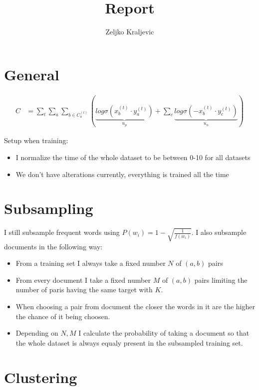 \documentclass[11pt,a4paper]{article}
\title{Report}
\author{Zeljko Kraljevic}
\begin{document}
\maketitle

\section{General}

\begin{align}
        C &= \sum_{t} \sum_{a} \sum_{b \in C_{a}^{(t)}} \left( \underbrace{log \sigma \left( x_{b}^{(t)} \cdot 
                y_{a}^{(t)} \right)}_{u_p}
                + \sum_{c} \underbrace{log \sigma \left( - x_{b}^{(t)} \cdot y_{c}^{(t)} \right)}_{u_n} \right)
\end{align}

Setup when training:
\begin{itemize}
	\item I normalize the time of the whole dataset to be between 0-10 for all datasets
	\item We don't have alterations currently, everything is trained all the time
\end{itemize} 


\section{Subsampling}
I still subsample frequent words using $P(w_i) = 1 - \sqrt{\frac{1}{f(w_i)}}$. I also subsample documents in the following way:
\begin{itemize}
	\item From a training set I always take a fixed number $N$ of $(a, b)$ pairs
	\item From every document I take a fixed number $M$ of $(a, b)$ pairs limiting the number of paris having the same target with $K$. 
	\item When choosing a pair from document the closer the words in it are the higher the chance of it being choosen.
	\item Depending on $N, M$ I calculate the probability of taking a document so that the whole dataset is always equaly present in the subsampled training set. 
\end{itemize}

\section{Clustering}
\end{document}
